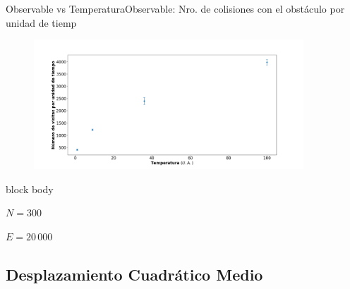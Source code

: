 \documentclass{beamer}
\begin{document}
            \begin{frame}{Observable vs Temperatura}{Observable: Nro. de colisiones con el obstáculo por unidad de tiemp}
                \begin{figure}[H!]
                    \includegraphics[width=0.9\textwidth]{./slope_vs_temperature}
                    \label{fig:slope_2}
                \end{figure}
                \begin{beamercolorbox}[sep=5pt,center]{block body}
                    \begin{minipage}[t]{0.45\textwidth}
                        \centering
                        \small{$N=300$}
                    \end{minipage}
                    \hfill
                    \begin{minipage}[t]{0.45\textwidth}
                        \centering
                        \small{$E=20\,000$}
                    \end{minipage}
                \end{beamercolorbox}
            \end{frame}

        \subsection{Desplazamiento Cuadrático Medio}
\end{document}
